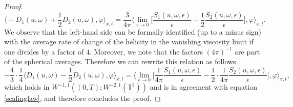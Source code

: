 \documentclass[12pt,a4paper]{article}
\theoremstyle{definition}
\theoremstyle{remark}
\numberwithin{equation}{section}
\begin{document}
\begin{proof}
\begin{equation*}
\bigg\langle - D_{1} (u, \omega) + \frac{1}{2} D_{2} (u, \omega) ,  \varphi \bigg\rangle_{x,t} = \frac{3}{4 \pi} \bigg\langle \lim_{\epsilon \rightarrow 0} \bigg[ \frac{S_1 (u,\omega,\epsilon)}{\epsilon} - \frac{1}{2} \frac{S_2 (u,\omega,\epsilon)}{\epsilon} \bigg] , \varphi \bigg\rangle_{x,t}.
\end{equation*}
We observe that the left-hand side can be formally identified (up to a minus sign) with the average rate of change of the helicity in the vanishing viscosity limit if one divides by a factor of $4$. Moreover, we note that the factors $(4 \pi)^{-1}$ are part of the spherical averages. Therefore we can rewrite this relation as follows
\begin{equation}
-\frac{4}{3} \cdot \frac{1}{4} \bigg\langle D_1 (u, \omega) - \frac{1}{2} D_2 (u, \omega), \varphi \bigg\rangle_{x,t} = \bigg\langle \lim_{\epsilon \rightarrow 0} \bigg[ \frac{1}{4 \pi} \frac{S_1 (u,\omega,\epsilon)}{\epsilon} - \frac{1}{2} \cdot \frac{1}{4 \pi} \frac{S_2 (u,\omega,\epsilon)}{\epsilon} \bigg] , \varphi \bigg\rangle_{x,t},
\end{equation}
which holds in $W^{-1,1} ((0,T); W^{-2,1} (\mathbb{T}^3))$ and is in agreement with equation \eqref{scalinglaw}, and therefore concludes the proof.
\end{proof}
\end{document}
